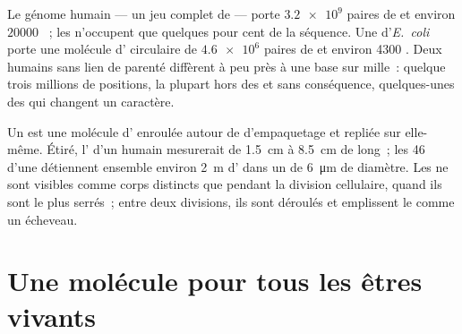 \begin{example}\label{ex:g10:universal-dna:numbers}
Le génome humain --- un jeu complet de  --- porte
$\num{3.2e9}$ paires de  et environ $\num{20000}$ ~; les
 n'occupent que quelques pour cent de la séquence. Une 
d'\emph{E.~coli} porte une molécule d' circulaire de $\num{4.6e6}$
paires de  et environ 4300 . Deux humains sans lien de
parenté diffèrent à peu près à une base sur mille~: quelque trois
millions de positions, la plupart hors des  et sans conséquence,
quelques-unes des  qui changent un caractère.
\end{example}

\begin{proposition}[Chromosomes]\label{prop:g10:universal-dna:chromosome}
Un  est une molécule d' enroulée autour de 
d'empaquetage et repliée sur elle-même. Étiré, l' d'un 
humain mesurerait de \qty{1.5}{cm} à \qty{8.5}{cm} de long~; les 46
 d'une  détiennent ensemble environ \qty{2}{m} d'
dans un  de \qty{6}{\micro m} de diamètre. Les  ne sont
visibles comme corps distincts que pendant la division cellulaire,
quand ils sont le plus serrés~; entre deux divisions, ils sont déroulés
et emplissent le  comme un écheveau.
\end{proposition}
\admitted

\section{Une molécule pour tous les êtres vivants}


